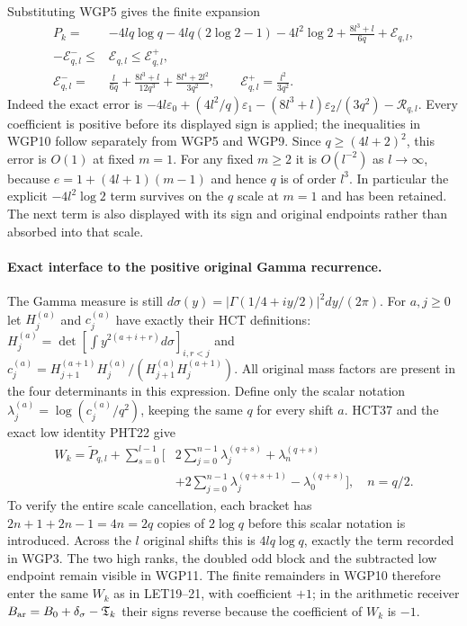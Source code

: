 \documentclass[11pt,a4paper]{article}
\begin{document}
Substituting WGP5 gives the finite expansion
\[
 \boxed{\begin{aligned}
 P_k={}&-4lq\log q-4lq(2\log2-1)-4l^2\log2
             +\frac{8l^3+l}{6q}+\mathcal E_{q,l},\\
 -\mathcal E^-_{q,l}\le{}&\mathcal E_{q,l}\le\mathcal E^+_{q,l},\\
 \mathcal E^-_{q,l}={}&\frac{l}{6q}
       +\frac{8l^3+l}{12q^3}
       +\frac{8l^4+2l^2}{3q^2},\qquad
 \mathcal E^+_{q,l}=\frac{l^2}{3q^2}.
 \end{aligned}}\tag{WGP10}
\]
Indeed the exact error is
$-4l\varepsilon_0+(4l^2/q)\varepsilon_1
 -(8l^3+l)\varepsilon_2/(3q^2)-\mathcal R_{q,l}$.
Every coefficient is positive before its displayed sign is applied;
the inequalities in WGP10 follow separately from WGP5 and WGP9.
Since $q\ge(4l+2)^2$, this error is $O(1)$ at fixed $m=1$.
For any fixed $m\ge2$ it is $O(l^{-2})$ as $l\to\infty$, because
$e=1+(4l+1)(m-1)$ and hence $q$ is of order $l^3$.
In particular the explicit $-4l^2\log2$ term survives on the $q$ scale
at $m=1$ and has been retained. The next term is also displayed with
its sign and original endpoints rather than absorbed into that scale.

\paragraph{Exact interface to the positive original Gamma recurrence.}
The Gamma measure is still
$d\sigma(y)=|\Gamma(1/4+iy/2)|^2dy/(2\pi)$.
For $a,j\ge0$ let $H_j^{(a)}$ and $c_j^{(a)}$ have exactly their
HCT definitions: $H_j^{(a)}=\det[\int y^{2(a+i+r)}d\sigma]_{i,r<j}$
and $c_j^{(a)}=H_{j+1}^{(a+1)}H_j^{(a)}/
(H_{j+1}^{(a)}H_j^{(a+1)})$. All original mass factors are present
in the four determinants in this expression. Define only the scalar
notation $\lambda_j^{(a)}=\log(c_j^{(a)}/q^2)$, keeping the same $q$
for every shift $a$. HCT37 and the exact low identity PHT22 give
\[
 \boxed{\begin{aligned}
 W_k=\widetilde P_{q,l}+\sum_{s=0}^{l-1}\bigg[
  &2\sum_{j=0}^{n-1}\lambda_j^{(q+s)}+\lambda_n^{(q+s)}\\
  &+2\sum_{j=0}^{n-1}\lambda_j^{(q+s+1)}
       -\lambda_0^{(q+s)}\bigg],\quad n=q/2.
 \end{aligned}}\tag{WGP11}
\]
To verify the entire scale cancellation, each bracket has
$2n+1+2n-1=4n=2q$ copies of $2\log q$ before this scalar
notation is introduced. Across the $l$ original shifts this is
$4lq\log q$, exactly the term recorded in WGP3. The two high ranks,
the doubled odd block and the subtracted low endpoint remain visible
in WGP11. The finite remainders in WGP10 therefore enter the same
$W_k$ as in LET19--21, with coefficient $+1$; in the arithmetic
receiver $B_{\rm ar}=B_0+\delta_\sigma-\mathfrak T_k$ their signs
reverse because the coefficient of $W_k$ is $-1$.
\end{document}
